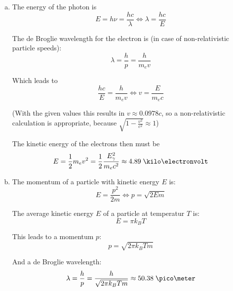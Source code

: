\documentclass[a4paper,german,12pt,smallheadings]{scrartcl}
\begin{document}
\begin{enumerate}[a)]
  \item
    The energy of the photon is
    \begin{equation*}
      E = h \nu = \frac{hc}{\lambda} \Leftrightarrow \lambda = \frac{hc}{E}
    \end{equation*}

    The de Broglie wavelength for the electron is (in case of non-relativistic particle speeds):
    \begin{equation*}
      \lambda = \frac{h}{p} = \frac{h}{m_e v}
    \end{equation*}

    Which leads to
    \begin{equation*}
      \frac{hc}{E} = \frac{h}{m_e v} \Leftrightarrow v = \frac{E}{m_e c}
    \end{equation*}

    (With the given values this results in $v \approx 0.0978 c$, so a
    non-relativistic calculation is appropriate, because $\sqrt{1 -
    \frac{v^2}{c^2}} \approx 1$)

    The kinetic energy of the electrons then must be
    \begin{equation*}
      E = \frac{1}{2} m_ev^2 = \frac{1}{2} \frac{E_\gamma^2}{m_e c^2} \approx 4.89 \; \kilo\electronvolt
    \end{equation*}
  \item
    The momentum of a particle with kinetic energy $E$ is:
    \begin{equation*}
      E = \frac{p^2}{2m} \Leftrightarrow p = \sqrt{2 E m}
    \end{equation*}

    The average kinetic energy $E$ of a particle at temperatur $T$ is:
    \begin{equation*}
      E = \pi k_B T
    \end{equation*}

    This leads to a momentum $p$:
    \begin{equation*}
      p = \sqrt{2 \pi k_B T m}
    \end{equation*}

    And a de Broglie wavelength:
    \begin{equation*}
      \lambda = \frac{h}{p} = \frac{h}{\sqrt{2 \pi k_B T m}} \approx 50.38 \; \pico\meter
    \end{equation*}


\end{enumerate}
\end{document}
